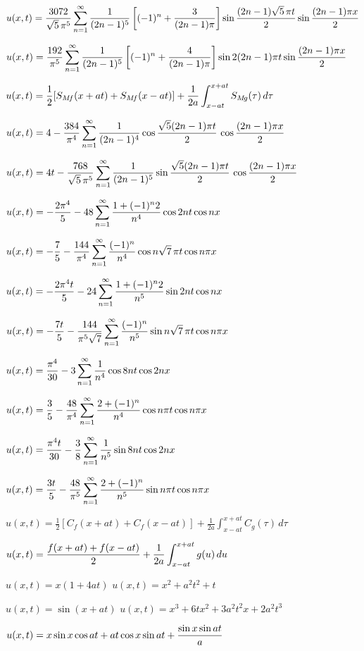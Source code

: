 $u(x,t)=\displaystyle\frac{3072}{\sqrt{5}\,\pi^{5}}\sum_{n=1}^{\infty}\frac{1}{(2n-1)^{5}}
\left[(-1)^{n}+\frac{3}{(2n-1)\pi}\right]
\sin\frac{(2n-1)\sqrt{5}\,\pi t}{2}\sin\frac{(2n-1)\pi x}{2}$

$u(x,t)=\displaystyle\frac{192}{\pi^{5}}\sum_{n=1}^{\infty}\frac{1}{(2n-1)^{5}}
\left[(-1)^{n}+\frac{4}{(2n-1)\pi}\right]\sin2(2n-1)\pi
t\sin\frac{(2n-1)\pi x}{2}$

$\displaystyle u(x,t)=\frac{1}{2}[S_{M\!f}(x+at)+S_{M\!f}(x-at)]+
\frac{1}{2a}\int_{x-at}^{x+at}S_{M\!g}(\tau)\,d\tau$

$u(x,t)=\displaystyle4-\frac{384}{\pi^{4}}\sum_{n=1}^{\infty}\frac{1}{(2n-1)^{4}}\cos\frac{\sqrt{5}(2n-1)\pi t}{2}\,\cos\frac{(2n-1)\pi x}{2}$

$u(x,t)=\displaystyle4t-\frac{768}{\sqrt{5}\,\pi^{5}}\sum_{n=1}^{\infty}\frac{1}{(2n-1)^{5}}\sin\frac{\sqrt{5}(2n-1)\pi t}{2}\,\cos\frac{(2n-1)\pi x}{2}$

$u(x,t)=\displaystyle-\frac{2\pi^{4}}{5}-48\sum_{n=1}^{\infty}\frac{1+(-1)^{n}2}{n^{4}}\cos2nt\cos nx$

$u(x,t)=\displaystyle-\frac{7}{5}-\frac{144}{\pi^{4}}\sum_{n=1}^{\infty}\frac{(-1)^{n}}{n^{4}}\cos n\sqrt{7}\,\pi t\cos n\pi x$

$u(x,t)=\displaystyle-\frac{2\pi^{4}t}{5}-24\sum_{n=1}^{\infty}\frac{1+(-1)^{n}2}{n^{5}}\sin2nt\cos nx$

$u(x,t)=\displaystyle-\frac{7t}{5}-\frac{144}{\pi^{5}\sqrt{7}}\sum_{n=1}^{\infty}\frac{(-1)^{n}}{n^{5}}\sin n\sqrt{7}\,\pi t\cos n\pi x$

$u(x,t)=\displaystyle{\frac{\pi^{4}}{30}-3\sum_{n=1}^{\infty}\frac{1}{n^{4}}\cos8nt\cos2nx}$

$u(x,t)=\displaystyle\frac{3}{5}-\frac{48}{\pi^{4}}\sum_{n=1}^{\infty}\frac{2+(-1)^{n}}{n^{4}}\cos n\pi t\cos n\pi x$

$u(x,t)=\displaystyle{\frac{\pi^{4}t}{30}-\frac{3}{8}\sum_{n=1}^{\infty}\frac{1}{n^{5}}\sin8nt\cos2nx}$

$u(x,t)=\displaystyle\frac{3t}{5}-\frac{48}{\pi^{5}}\sum_{n=1}^{\infty}\frac{2+(-1)^{n}}{n^{5}}\sin n\pi t\cos n\pi x$

$u(x,t)=\frac{1}{2}[C_{f}(x+at)+C_{f}(x-at)]+
\frac{1}{2a}\int_{x-at}^{x+at}C_{g}(\tau)\,d\tau$

$u(x,t)=\displaystyle\frac{f(x+at)+f(x-at)}{2}+
\frac{1}{2a}\int_{x-at}^{x+at}g(u)\,du$

$u(x,t)=x(1+4at)$
$u(x,t)=x^{2}+a^{2}t^{2}+t$

$u(x,t)=\sin(x+at)$
$u(x,t)=x^{3}+6tx^{2}+3a^{2}t^{2}x+2a^{2}t^{3}$

$u(x,t)=\displaystyle x\sin x\cos at+at\cos x\sin at+\frac{\sin x\sin at}{a}$

